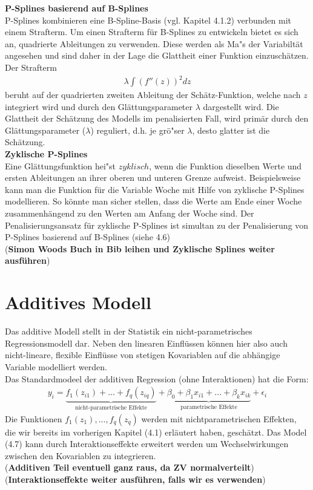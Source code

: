 \documentclass[12pt]{scrreprt}
\begin{document}
	\noindent\textbf{P-Splines basierend auf B-Splines} \\
	P-Splines kombinieren eine B-Spline-Basis (vgl. Kapitel 4.1.2) verbunden mit einem Strafterm. Um einen Strafterm für B-Splines zu entwickeln bietet es sich an, quadrierte Ableitungen zu verwenden. Diese werden als Ma"s der Variabiltät angesehen und sind daher in der Lage die Glattheit einer Funktion einzuschätzen.
	Der Strafterm 
	\begin{align}
	\lambda\int(f''(z))^2dz
	\end{align}
	beruht auf der quadrierten zweiten Ableitung der Schätz-Funktion, welche nach $z$ integriert wird und durch den Glättungsparameter $\lambda$ dargestellt wird. Die Glattheit der Schätzung des Modells im penalisierten Fall, wird primär durch den Glättungsparameter ($\lambda$) reguliert, d.h. je grö"ser $\lambda$, desto glatter ist die Schätzung.\\
	
	\noindent\textbf{Zyklische P-Splines} \\
	Eine Glättungsfunktion hei"st $zyklisch$, wenn die Funktion dieselben Werte und ersten Ableitungen an ihrer oberen und unteren Grenze aufweist. Beispielsweise kann man die Funktion für die Variable Woche mit Hilfe von zyklische P-Splines modellieren. So könnte man sicher stellen, dass die Werte am Ende einer Woche zusammenhängend zu den Werten am Anfang der Woche sind. Der Penalisierungsansatz für zyklische P-Splines ist simultan zu der Penalisierung von P-Splines basierend auf B-Splines (siehe 4.6) \\
	(\textbf{Simon Woods Buch in Bib leihen und Zyklische Splines weiter ausführen})
	
	
	\section{Additives Modell}
	Das additive Modell stellt in der Statistik ein nicht-parametrisches Regressionsmodell dar. Neben den linearen Einﬂüssen können hier also auch nicht-lineare, flexible Einflüsse von stetigen Kovariablen auf die abhängige Variable modelliert werden. \\
	Das Standardmodeel der additiven Regression (ohne Interaktionen) hat die Form:
	\begin{align} 
	y_{i}=\underbrace{f_{1}(z_{i1})+...+f_{q}(z_{iq})}_{\text{nicht-parametrische Effekte}}+\underbrace{\beta_{0}+\beta_{1}x_{i1}+...+\beta_{k}x_{ik}}_{\text{parametrische Effekte}}+\epsilon_{i}
	\end{align}
	Die Funktionen $f_{1}(z_{1}),...,f_{q}(z_{q})$ werden mit nichtparametrischen Effekten, die wir bereits im vorherigen Kapitel (4.1) erläutert haben, geschätzt. Das Model (4.7) kann durch Interaktionseffekte erweitert werden um Wechselwirkungen zwischen den Kovariablen zu integrieren.\\
	(\textbf{Additiven Teil eventuell ganz raus, da ZV normalverteilt}) \\
		(\textbf{Interaktionseffekte weiter ausführen, falls wir es verwenden})
\end{document}
